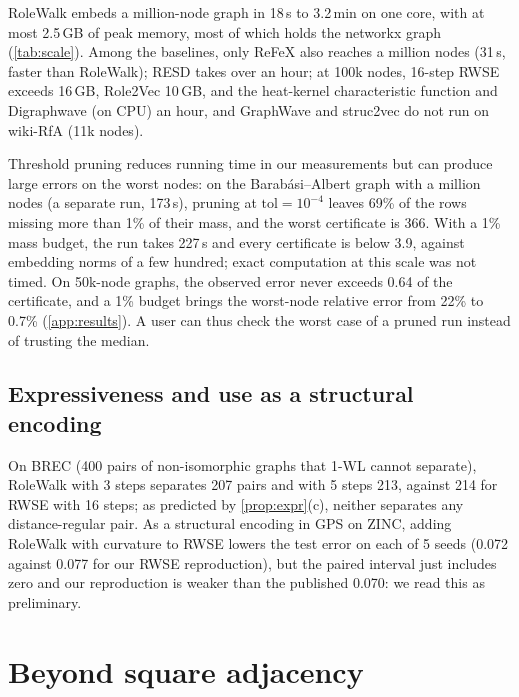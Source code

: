 \documentclass[10pt]{article}
\theoremstyle{definition}
\newcommand{\tol}{\mathrm{tol}}
\begin{document}
RoleWalk embeds a million-node graph in 18\,s to 3.2\,min on one core, with at most 2.5\,GB of peak memory, most of which holds the networkx graph (\cref{tab:scale}).
Among the baselines, only ReFeX also reaches a million nodes (31\,s, faster than RoleWalk); RESD takes over an hour; at 100k nodes, 16-step RWSE exceeds 16\,GB, Role2Vec 10\,GB, and the heat-kernel characteristic function and Digraphwave (on CPU) an hour, and GraphWave and struc2vec do not run on wiki-RfA (11k nodes).

Threshold pruning reduces running time in our measurements but can produce large errors on the worst nodes: on the Barabási--Albert graph with a million nodes (a separate run, 173\,s), pruning at $\tol=10^{-4}$ leaves 69\% of the rows missing more than 1\% of their mass, and the worst certificate is 366.
With a 1\% mass budget, the run takes 227\,s and every certificate is below 3.9, against embedding norms of a few hundred; exact computation at this scale was not timed.
On 50k-node graphs, the observed error never exceeds 0.64 of the certificate, and a 1\% budget brings the worst-node relative error from 22\% to 0.7\% (\cref{app:results}).
A user can thus check the worst case of a pruned run instead of trusting the median.

\subsection{Expressiveness and use as a structural encoding}

On BREC \citep{wang2023} (400 pairs of non-isomorphic graphs that 1-WL cannot separate), RoleWalk with 3 steps separates 207 pairs and with 5 steps 213, against 214 for RWSE with 16 steps; as predicted by \cref{prop:expr}(c), neither separates any distance-regular pair.
As a structural encoding in GPS \citep{rampasek2022} on ZINC, adding RoleWalk with curvature to RWSE lowers the test error on each of 5 seeds (0.072 against 0.077 for our RWSE reproduction), but the paired interval just includes zero and our reproduction is weaker than the published 0.070: we read this as preliminary.

\section{Beyond square adjacency}
\end{document}
